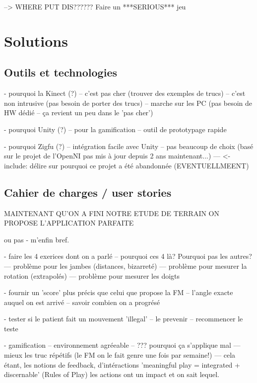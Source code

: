 \documentclass[french,12pt]{report}
\begin{document}
	
	
		--> WHERE PUT DIS?????? Faire un ***SERIOUS*** jeu
		
		
		
		\section{Solutions}
		
		\subsection{Outils et technologies} 		%
		

		
		- pourquoi la Kinect (?)
		-- c'est pas cher (trouver des exemples de trucs)
		-- c'est non intrusive (pas besoin de porter des trucs)
		-- marche sur les PC (pas besoin de HW dédié -- ça revient un peu dans le 'pas cher')
		
		- pourquoi Unity (?)
		-- pour la gamification
		-- outil de prototypage rapide
		
		- pourquoi Zigfu (?)
		-- intégration facile avec Unity
		-- pas beaucoup de choix (basé sur le projet de l'OpenNI pas mis à jour depuis 2 ans maintenant...)
		--- <- include: délire sur pourquoi ce projet a été abandonnée (EVENTUELLMEENT)
		
		
		\subsection{Cahier de charges / user stories} 		%
		
		MAINTENANT QU'ON A FINI NOTRE ETUDE DE TERRAIN ON PROPOSE L'APPLICATION PARFAITE 
		
		ou pas - m'enfin bref.
		
		- faire les 4 exerices dont on a parlé
		-- pourquoi ces 4 là? Pourquoi pas les autres?
		--- problème pour les jambes (distances, bizarreté)
		--- problème pour mesurer la rotation (extrapolés)
		--- problème pour mesurer les doigts 
		
		- fournir un 'score' plus précis que celui que propose la FM
		-- l'angle exacte auquel on est arrivé
		-- savoir combien on a progrésé
		
		- tester si le patient fait un mouvement 'illegal'
		-- le prevenir
		-- recommencer le teste
		
		
		- gamification
		-- environnement agréeable
		-- ??? pourquoi ça s'applique mal
		--- mieux les truc répétifs (le FM on le fait genre une fois par semaine!)
		--- cela étant, les notions de feedback, d'intéractions 
			'meaningful play = integrated + discernable' (Rules of Play) les actions ont un 
			impact et on sait lequel. 
		
\end{document}
